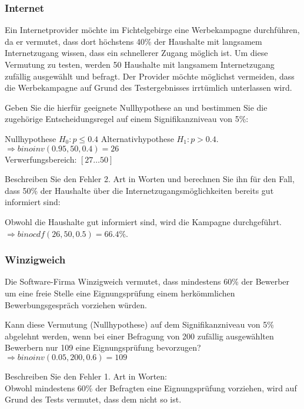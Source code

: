 \documentclass[landscape,twocolumn,a4paper]{article}
\begin{document}
\subsubsection*{Internet}
Ein Internetprovider möchte im Fichtelgebirge eine Werbekampagne durchführen, da er vermutet, dass dort höchstens 40\% der Haushalte mit langsamem Internetzugang wissen, dass ein schnellerer Zugang möglich ist. Um diese Vermutung zu testen, werden 50 Haushalte mit langsamem Internetzugang zufällig ausgewählt und befragt. Der Provider möchte möglichst vermeiden, dass die Werbekampagne auf Grund des Testergebnisses irrtümlich unterlassen wird.

Geben Sie die hierfür geeignete Nullhypothese an und bestimmen Sie die zugehörige Entscheidungsregel auf einem Signifikanzniveau von 5\%:

Nullhypothese $H_0 : p \leq 0.4$ Alternativhypothese $H_1 : p > 0.4$. \\
$\Rightarrow binoinv(0.95,50,0.4) = 26$ \\
Verwerfungsbereich: $[27 \dots 50]$ 

Beschreiben Sie den Fehler 2. Art in Worten und berechnen Sie ihn für den Fall, dass 50\% der Haushalte über die Internetzugangsmöglichkeiten bereits gut informiert sind:

Obwohl die Haushalte gut informiert sind, wird die Kampagne durchgeführt.
$\Rightarrow binocdf (26, 50, 0.5) = 66.4\%$.

\subsubsection*{Winzigweich}
Die Software-Firma Winzigweich vermutet, dass mindestens 60\% der Bewerber um eine freie Stelle eine Eignungsprüfung einem herkömmlichen Bewerbungsgespräch vorziehen würden.

Kann diese Vermutung (Nullhypothese) auf dem Signifikanzniveau von 5\% abgelehnt werden, wenn bei einer Befragung von 200 zufällig ausgewählten Bewerbern nur 109 eine Eignungsprüfung bevorzugen? \\
$\Rightarrow binoinv(0.05,200,0.6) = 109$

Beschreiben Sie den Fehler 1. Art in Worten: \\
Obwohl mindestens 60\% der Befragten eine Eignungsprüfung vorziehen, wird auf Grund des Tests vermutet, dass dem nicht so ist.
 
\end{document}
